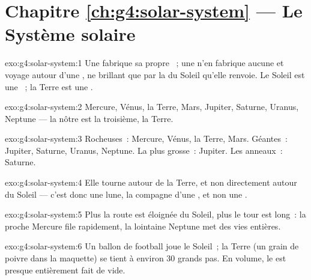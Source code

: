 \section*{Chapitre \ref{ch:g4:solar-system} --- Le Système solaire}

\begin{solution}{exo:g4:solar-system:1}
Une  fabrique sa propre ~; une  n'en fabrique
aucune et voyage autour d'une , ne brillant que par la 
du Soleil qu'elle renvoie. Le Soleil est une ~; la Terre est
une .
\end{solution}

\begin{solution}{exo:g4:solar-system:2}
Mercure, Vénus, la Terre, Mars, Jupiter, Saturne, Uranus, Neptune ---
la nôtre est la troisième, la Terre.
\end{solution}

\begin{solution}{exo:g4:solar-system:3}
Rocheuses~: Mercure, Vénus, la Terre, Mars. Géantes~: Jupiter,
Saturne, Uranus, Neptune. La plus grosse~: Jupiter. Les anneaux~:
Saturne.
\end{solution}

\begin{solution}{exo:g4:solar-system:4}
Elle tourne autour de la Terre, et non directement autour du Soleil
--- c'est donc une lune, la compagne d'une , et non une
.
\end{solution}

\begin{solution}{exo:g4:solar-system:5}
Plus la route est éloignée du Soleil, plus le tour est long~: la
proche Mercure file rapidement, la lointaine Neptune met des vies
entières.
\end{solution}

\begin{solution}{exo:g4:solar-system:6}
Un ballon de football joue le Soleil~; la Terre (un grain de poivre
dans la maquette) se tient à environ $30$ grands pas. En volume, le
 est presque entièrement fait de vide.
\end{solution}

